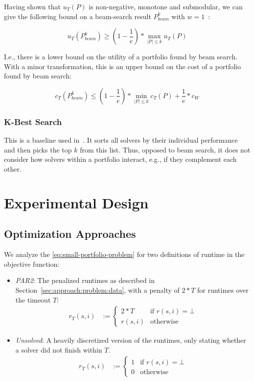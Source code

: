 \documentclass[conference]{IEEEtran}
\begin{document}
Having shown that $u_{T}(P)$ is non-negative, monotone and submodular, we can give the following bound on a beam-search result $P_{beam}^k$ with $w=1$~\cite{nemhauser1978analysis, krause2014submodular}:

\begin{equation}
	u_{T}(P_{beam}^k) \geq (1 - \frac{1}{e}) * \max_{|P| \leq k}{u_{T}(P)}
\end{equation}

I.e., there is a lower bound on the utility of a portfolio found by beam search.
With a minor transformation, this is an upper bound on the cost of a portfolio found by beam search:

\begin{equation}
	c_{T}(P_{beam}^k) \leq (1 - \frac{1}{e}) * \min_{|P| \leq k}{c_{T}(P)} + \frac{1}{e} * c_W
	\label{eq:upper-bound}
\end{equation}

\subsubsection{K-Best Search}

This is a baseline used in~\cite{nof2020real}.
It sorts all solvers by their individual performance and then picks the top $k$ from this list.
Thus, opposed to beam search, it does not consider how solvers within a portfolio interact, e.g., if they complement each other.

\section{Experimental Design}
\label{sec:experimental-design}

\subsection{Optimization Approaches}

We analyze the \ref{eq:small-portfolio-problem} for two definitions of runtime in the objective function:

\begin{itemize}
	\item \emph{PAR2}:
	The penalized runtimes as described in Section~\ref{sec:approach:problem:data}, with a penalty of $2*T$ for runtimes over the timeout $T$:
	\begin{align*}
		r_T(s,i) &:= \begin{cases}
			2*T & \text{if }r(s,i) = \bot\\
			r(s,i) & \text{otherwise}
		\end{cases}
	\end{align*}
	\item \emph{Unsolved}:
	A heavily discretized version of the runtimes, only stating whether a solver did not finish within $T$.
	\begin{align*}
		r_T(s,i) &:= \begin{cases}
			1 & \text{if }r(s,i) = \bot\\
			0 & \text{otherwise}
		\end{cases}
	\end{align*}
\end{itemize}
\end{document}
